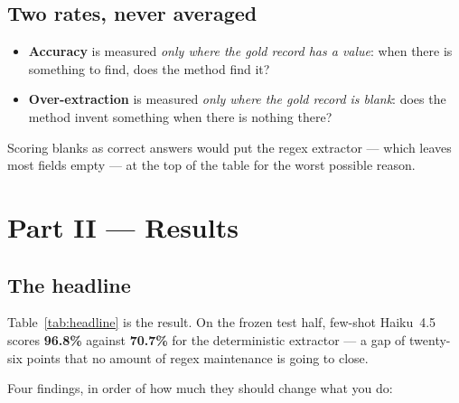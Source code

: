 \documentclass[11pt]{article}
\begin{document}
\subsection{Two rates, never averaged}
\label{sec:tworates}

\begin{itemize}
\item \textbf{Accuracy} is measured \emph{only where the gold record has a value}: when there
is something to find, does the method find it?
\item \textbf{Over-extraction} is measured \emph{only where the gold record is blank}: does
the method invent something when there is nothing there?
\end{itemize}

Scoring blanks as correct answers would put the regex extractor --- which leaves most fields
empty --- at the top of the table for the worst possible reason.

\section{Part II --- Results}



\subsection{The headline}

Table~\ref{tab:headline} is the result. On the frozen test half, few-shot Haiku~4.5 scores
\textbf{96.8\%} against \textbf{70.7\%} for the deterministic extractor --- a gap of twenty-six
points that no amount of regex maintenance is going to close.

Four findings, in order of how much they should change what you do:
\end{document}

